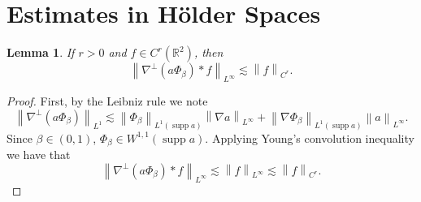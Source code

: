 \documentclass[12pt,xcolor=svgnames]{amsart}
\newtheorem{lemma}[theorem]{Lemma}
\newcommand{\R}{\mathbb{R}}
\newcommand{\norm}[2]{\left\lVert#1\right\rVert_{#2}}
\DeclareMathOperator\supp{supp}
\begin{document}
\appendix
\section{\\Estimates in Hölder Spaces}

\begin{lemma} If $r>0$ and $f \in C^r(\R^2)$, then
$$
\norm{\nabla^{\perp}(a\Phi_{\beta})\ast f}{L^{\infty}} \lesssim \norm{f}{C^r}.
$$
\end{lemma}
\begin{proof} First, by the Leibniz rule we note
$$
\norm{\nabla^{\perp}(a\Phi_{\beta})}{L^1} \lesssim \norm{\Phi_{\beta}}{L^1(\supp{a})}\norm{\nabla a}{L^{\infty}} + \norm{\nabla \Phi_{\beta}}{L^1(\supp{a})}\norm{a}{L^{\infty}}.
$$
Since $\beta \in (0,1)$,  $\Phi_{\beta}\in W^{1,1}(\supp{a})$. Applying Young's convolution inequality we have that 
$$
\norm{\nabla^{\perp}(a\Phi_{\beta})\ast f}{L^{\infty}} \lesssim \norm{f}{L^{\infty}} \lesssim \norm{f}{C^r}.
$$
\end{proof}
\end{document}
